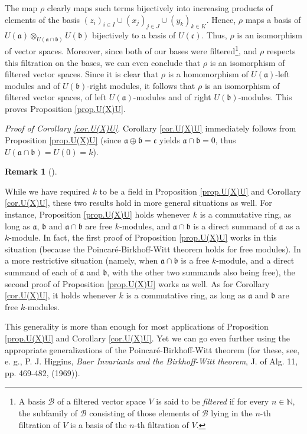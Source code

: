 \documentclass
[numbers=enddot,12pt,final,onecolumn,german,notitlepage]{scrartcl}%
\theoremstyle{definition}
\newtheorem{remk}[theo]{Remark}
\newenvironment{remark}[1][]
{\begin{remk}[#1]\begin{leftbar}}
{\end{leftbar}\end{remk}}
\begin{document}
The map $\rho$ clearly maps such terms bijectively into increasing products of
elements of the basis $\left(  z_{i}\right)  _{i\in I}\cup\left(
x_{j}\right)  _{j\in J}\cup\left(  y_{k}\right)  _{k\in K}$. Hence, $\rho$
maps a basis of $U\left(  \mathfrak{a}\right)  \otimes_{U\left(
\mathfrak{a}\cap\mathfrak{b}\right)  }U\left(  \mathfrak{b}\right)  $
bijectively to a basis of $U\left(  \mathfrak{c}\right)  $. Thus, $\rho$ is an
isomorphism of vector spaces. Moreover, since both of our bases were
filtered\footnote{A basis $\mathcal{B}$ of a filtered vector space $V$ is said
to be \textit{filtered} if for every $n\in\mathbb{N}$, the subfamily of
$\mathcal{B}$ consisting of those elements of $\mathcal{B}$ lying in the
$n$-th filtration of $V$ is a basis of the $n$-th filtration of $V$.}, and
$\rho$ respects this filtration on the bases, we can even conclude that $\rho$
is an isomorphism of filtered vector spaces. Since it is clear that $\rho$ is
a homomorphism of $U\left(  \mathfrak{a}\right)  $-left modules and of
$U\left(  \mathfrak{b}\right)  $-right modules, it follows that $\rho$ is an
isomorphism of filtered vector spaces, of left $U\left(  \mathfrak{a}\right)
$-modules and of right $U\left(  \mathfrak{b}\right)  $-modules. This proves
Proposition \ref{prop.U(X)U}.

\textit{Proof of Corollary \ref{cor.U(X)U}.} Corollary \ref{cor.U(X)U}
immediately follows from Proposition \ref{prop.U(X)U} (since $\mathfrak{a}%
\oplus\mathfrak{b}=\mathfrak{c}$ yields $\mathfrak{a}\cap\mathfrak{b}=0$, thus
$U\left(  \mathfrak{a}\cap\mathfrak{b}\right)  =U\left(  0\right)  =k$).

\begin{remark}
\label{rmk.U(X)U}While we have required $k$ to be a field in Proposition
\ref{prop.U(X)U} and Corollary \ref{cor.U(X)U}, these two results hold in more
general situations as well. For instance, Proposition \ref{prop.U(X)U} holds
whenever $k$ is a commutative ring, as long as $\mathfrak{a}$, $\mathfrak{b}$
and $\mathfrak{a}\cap\mathfrak{b}$ are free $k$-modules, and $\mathfrak{a}%
\cap\mathfrak{b}$ is a direct summand of $\mathfrak{a}$ as a $k$-module. In
fact, the first proof of Proposition \ref{prop.U(X)U} works in this situation
(because the Poincar\'{e}-Birkhoff-Witt theorem holds for free modules). In a
more restrictive situation (namely, when $\mathfrak{a}\cap\mathfrak{b}$ is a
free $k$-module, and a direct summand of each of $\mathfrak{a}$ and
$\mathfrak{b}$, with the other two summands also being free), the second proof
of Proposition \ref{prop.U(X)U} works as well. As for Corollary
\ref{cor.U(X)U}, it holds whenever $k$ is a commutative ring, as long as
$\mathfrak{a}$ and $\mathfrak{b}$ are free $k$-modules.

This generality is more than enough for most applications of Proposition
\ref{prop.U(X)U} and Corollary \ref{cor.U(X)U}. Yet we can go even further
using the appropriate generalizations of the Poincar\'{e}-Birkhoff-Witt
theorem (for these, see, e. g., P. J. Higgins, \textit{Baer Invariants and the
Birkhoff-Witt theorem}, J. of Alg. 11, pp. 469-482, (1969)).
\end{remark}
\end{document}
